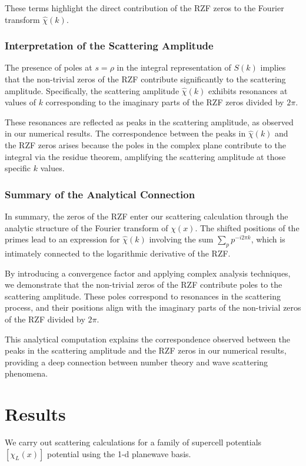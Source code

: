 \documentclass[11pt, oneside]{article}
\begin{document}
These terms highlight the direct contribution of the RZF zeros to the Fourier transform $\hat{\chi}(k)$.

\subsubsection{Interpretation of the Scattering Amplitude}

The presence of poles at $s = \rho$ in the integral representation of $S(k)$ implies that the non-trivial zeros of the RZF contribute significantly to the scattering amplitude. Specifically, the scattering amplitude $\hat{\chi}(k)$ exhibits resonances at values of $k$ corresponding to the imaginary parts of the RZF zeros divided by $2\pi$.

These resonances are reflected as peaks in the scattering amplitude, as observed in our numerical results. The correspondence between the peaks in $\hat{\chi}(k)$ and the RZF zeros arises because the poles in the complex plane contribute to the integral via the residue theorem, amplifying the scattering amplitude at those specific $k$ values.

\subsubsection{Summary of the Analytical Connection}

In summary, the zeros of the RZF enter our scattering calculation through the analytic structure of the Fourier transform of $\chi(x)$. The shifted positions of the primes lead to an expression for $\hat{\chi}(k)$ involving the sum $\sum_{p} p^{-i 2\pi k}$, which is intimately connected to the logarithmic derivative of the RZF.

By introducing a convergence factor and applying complex analysis techniques, we demonstrate that the non-trivial zeros of the RZF contribute poles to the scattering amplitude. These poles correspond to resonances in the scattering process, and their positions align with the imaginary parts of the non-trivial zeros of the RZF divided by $2\pi$.

This analytical computation explains the correspondence observed between the peaks in the scattering amplitude and the RZF zeros in our numerical results, providing a deep connection between number theory and wave scattering phenomena.


\section{Results}
We carry out scattering calculations for a family of supercell potentials $[\chi_L(x)]$ potential using the 1-d planewave basis.
\end{document}
